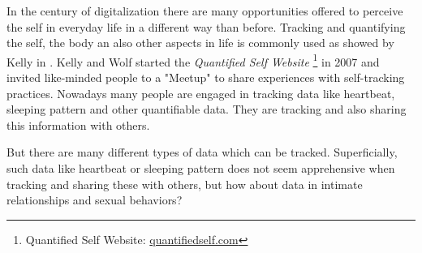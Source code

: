 \label{sec:introduction}

In the century of digitalization there are many opportunities offered to perceive the self in everyday life in a different way than before. Tracking and quantifying the self, the body an also other aspects in life is commonly used as showed by Kelly in \cite{kelly2017inevitable}. Kelly and Wolf started the \textit{Quantified Self Website} \footnote{Quantified Self Website: \url{quantifiedself.com}} in 2007 and invited like-minded people to a "Meetup" to share experiences with self-tracking practices. Nowadays many people are engaged in tracking data like heartbeat, sleeping pattern and other quantifiable data. They are tracking and also sharing this information with others. 



But there are many different types of data which can be tracked. Superficially, such data like heartbeat or sleeping pattern does not seem apprehensive when tracking and sharing these with others, but how about data in intimate relationships and sexual behaviors?


